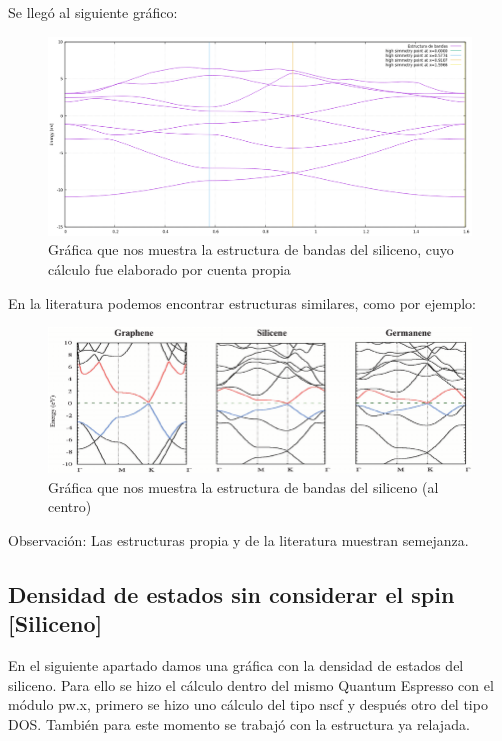 Se llegó al siguiente gráfico:

\begin{figure}[H]
    \centering
    \includegraphics[scale=0.45]{images_siliceno/bands_structure.png}
    \caption{Gráfica que nos muestra la estructura de bandas del siliceno, cuyo cálculo fue elaborado por cuenta propia}
\end{figure}

En la literatura podemos encontrar estructuras similares, como por ejemplo:

\begin{figure}[H]
    \centering
    \includegraphics[scale=0.5]{images_siliceno/Band-structures-of-graphene-left-silicene-centre-and-germanene-right-Valence-and.png}
    \caption{Gráfica que nos muestra la estructura de bandas del siliceno (al centro) \cite{miro2014atlas} }
\end{figure}

Observación: Las estructuras propia y de la literatura muestran semejanza.

\newpage


\subsection{Densidad de estados sin considerar el spin [Siliceno]}

En el siguiente apartado damos una gráfica con la densidad de estados del siliceno. Para 
ello se hizo el cálculo dentro del mismo Quantum Espresso con el módulo pw.x, primero se hizo uno cálculo 
del tipo nscf y después otro del tipo DOS. También para este momento se trabajó con la estructura
ya relajada.

